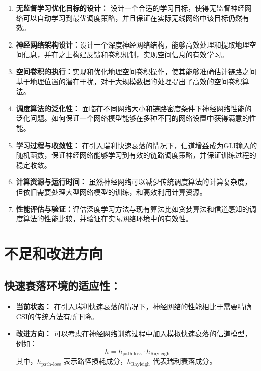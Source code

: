 \documentclass[UTF8, 12pt]{article}
\numberwithin{figure}{section}
\begin{document}
\begin{enumerate}
  \item \textbf{无监督学习优化目标的设计：} 设计一个合适的学习目标，使得无监督神经网络可以自动学习到最优调度策略，并且保证在实际无线网络中该目标仍然有效。

  \item \textbf{神经网络架构设计：}设计一个深度神经网络结构，能够高效处理和提取地理空间信息，并在之上构建反馈和卷积机制，实现空间信息的有效学习。

  \item \textbf{空间卷积的执行：}实现和优化地理空间卷积操作，使其能够准确估计链路之间基于地理位置的潜在干扰，对于大规模数据的处理提出了高效的空间卷积算法。

  \item \textbf{调度算法的泛化性：} 面临在不同网络大小和链路密度条件下神经网络性能的泛化问题。如何保证一个网络模型能够在多种不同的网络设置中获得满意的性能。

  \item \textbf{学习过程与收敛性：} 在引入瑞利快速衰落的情况下，信道增益成为GLI输入的随机函数，保证神经网络能够学习到有效的链路调度策略，并保证训练过程的稳定收敛。
  
  \item \textbf{计算资源与运行时间：} 虽然神经网络可以减少传统调度算法的计算复杂度，但依旧需要处理大型网络模型的训练，和高效利用计算资源。
  
  \item \textbf{性能评估与验证：}评估深度学习方法与现有算法比如贪婪算法和信道感知的调度算法的性能比较，并验证在实际网络环境中的有效性。
  \end{enumerate}

\clearpage
  \section{不足和改进方向}

  \subsection{快速衰落环境的适应性：}
  \begin{itemize}
      \item \textbf{当前状态：} 在引入瑞利快速衰落的情况下，神经网络的性能相比于需要精确CSI的传统方法有所下降。
      \item \textbf{改进方向：} 可以考虑在神经网络训练过程中加入模拟快速衰落的信道模型，例如：
      \[
      h = h_{\text{path-loss}} \cdot h_{\text{Rayleigh}}
      \]
      其中，\( h_{\text{path-loss}} \) 表示路径损耗成分，\( h_{\text{Rayleigh}} \) 代表瑞利衰落成分。
  \end{itemize}
  
\end{document}
